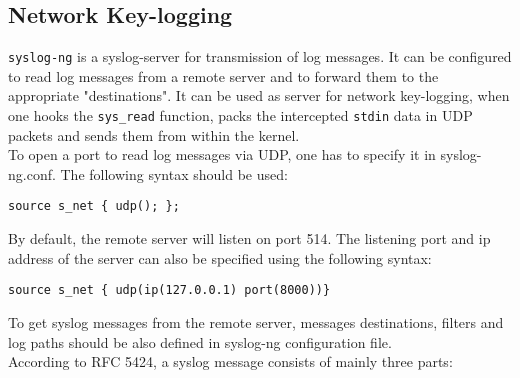 \subsection{Network Key-logging}
\texttt{syslog-ng} is a syslog-server for transmission of log messages. It can be configured to read log messages from a remote server and to forward them to the appropriate "destinations". It can be used as server for network key-logging, when one hooks the \texttt{sys\_read} function, packs the intercepted \texttt{stdin} data in UDP packets and sends them from within the kernel.\\ 
To open a port to read log messages via UDP, one has to specify it in syslog-ng.conf. The following syntax should be used:
\begin{center}
\lstset{escapechar=,style=customc}
\begin{lstlisting}
source s_net { udp(); };
\end{lstlisting}
\end{center}
By default, the remote server will listen on port 514. The listening port and ip address of the server can also be specified using the following syntax:
\begin{center}
\lstset{escapechar=,style=customc}
\begin{lstlisting}
source s_net { udp(ip(127.0.0.1) port(8000))}
\end{lstlisting}
\end{center}
To get syslog messages from the remote server, messages destinations, filters and log paths should be also defined in syslog-ng configuration file.\\
According to RFC 5424, a syslog message consists of mainly three parts:
